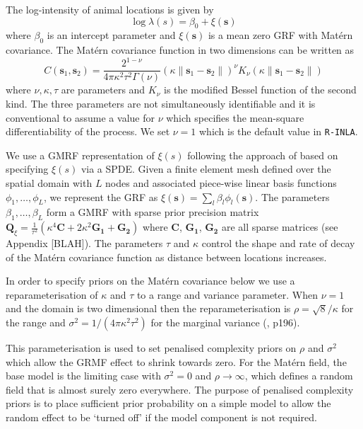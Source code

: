 \documentclass{stylefile16/statsoc}
\newcommand{\bs}{\mathbf{s}}
\newcommand{\bm}{\boldsymbol}  %
\begin{document}
The log-intensity of animal locations is given by
\begin{equation*}
\log \lambda(s) = \beta_0 + \xi(\bs)
\end{equation*}
where $\beta_0$ is an intercept parameter and $\xi(\bs)$ is a mean zero GRF with Mat\'ern covariance.  The Mat\'ern covariance function in two dimensions can be written as 
\begin{equation}
C(\bs_1,\bs_2) = \frac{2^{1-\nu}}{4\pi\kappa^2\tau^2\Gamma(\nu)}(\kappa \|\bs_1-\bs_2\|)^{\nu}K_\nu(\kappa \|\bs_1-\bs_2\|)
\end{equation}
where \(\nu, \kappa, \tau\) are parameters and \(K_{\nu}\) is the modified Bessel function of the second kind.  The three parameters are not simultaneously identifiable \citep{zhang_inconsistent_2004} and it is conventional to assume a value for $\nu$ which specifies the mean-square differentiability of the process.  We set $\nu = 1$ which is the default value in \texttt{R-INLA}.

We use a GMRF representation of $\xi(s)$ following the approach of \cite{lindgren_explicit_2011} based on specifying $\xi(s)$ via a SPDE.  Given a finite element mesh defined over the spatial domain with $L$ nodes and associated piece-wise linear basis functions $\phi_1, \ldots, \phi_L$, we represent the GRF as $\xi(\bs) = \sum_l \beta_l \phi_l(\bs)$.  The parameters $\beta_1, \ldots, \beta_L$ form a GMRF with sparse prior precision matrix $\bm{Q}_{\xi} = \frac{1}{\tau^2}\left(\kappa^4\bm{C} + 2\kappa^2\bm{G_1} + \bm{G_2}\right)$ where $\bm{C}$, $\bm{G_1}$, $\bm{G_2}$ are all sparse matrices (see Appendix [BLAH]). The parameters $\tau$ and $\kappa$ control the shape and rate of decay of the Mat\'ern covariance function as distance between locations increases. 

In order to specify priors on the Mat\'ern covariance below we use a reparameterisation of $\kappa$ and $\tau$ to a range and variance parameter.  When $\nu = 1$ and the domain is two dimensional then the reparameterisation is $\rho = \sqrt{8} / \kappa$ for the range and $\sigma^2 = 1 / (4\pi\kappa^2\tau^2)$ for the marginal variance (\cite{blangiardo_spatial_2013}, p196).

This parameterisation is used to set penalised complexity priors \citep{simpson_penalising_2017} on $\rho$ and $\sigma^2$ which allow the GRMF effect to shrink towards zero.  For the Mat\'ern field, the base model is the limiting case with $\sigma^2 = 0$ and $\rho \rightarrow \infty$, which defines a random field that is almost surely zero everywhere.  The purpose of penalised complexity priors is to place sufficient prior probability on a simple model to allow the random effect to be `turned off' if the model component is not required.  
\end{document}
